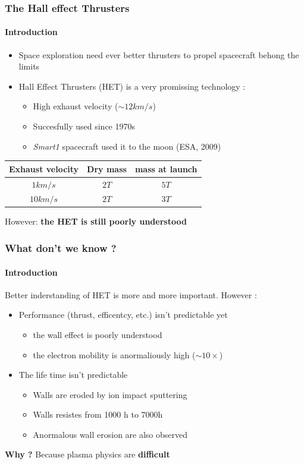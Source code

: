 \documentclass[sans, aspectratio=169]{beamer}
\begin{document}
\begin{frame} 
	\frametitle{The Hall effect Thrusters} 
	\framesubtitle{Introduction} 
	\begin{itemize} 
		\item Space exploration need ever better thrusters to propel spacecraft behong the limits
		\item Hall Effect Thrusters (HET) is a very promissing technology :
		\begin{itemize} 
			\item High exhaust velocity ($\sim 12 km/s$)
			\item Succesfully used since 1970s
			\item \textit{Smart1} spacecraft used it to the moon (ESA, 2009)
		\end{itemize}
	\end{itemize}
	
	\renewcommand{\arraystretch}{1.2}%
	\begin{center}
		\begin{tabular}{c|c|c}
			Exhaust velocity & Dry mass & mass at launch \\ \hline 
			$1 km/s$ &   $2 T $     &  $5 T$ \\
			$10 km/s$&  $ 2 T  $   &  $3 T$
		\end{tabular}
	\end{center}
	
	However: \textbf{the HET is still poorly understood}

\end{frame}

\begin{frame} 
\frametitle{What don't we know ?} 
\framesubtitle{Introduction} 
Better inderstanding of HET is more and more important. However :

\begin{itemize}
\item Performance (thrust, efficentcy, etc.) isn't predictable yet
	\begin{itemize}
		\item the wall effect is poorly understood
		\item the electron mobility is anormaliously high ($\sim 10 \times$)
	\end{itemize}
\item The life time isn't predictable
	\begin{itemize}
		\item Walls are eroded by ion impact sputtering
		\item Walls resistes from 1000 h to 7000h
		\item Anormalous wall erosion are also observed
	\end{itemize}
\end{itemize}

\textbf{Why ?} Because plasma physics are \textbf{difficult}

\end{frame}
\end{document}
